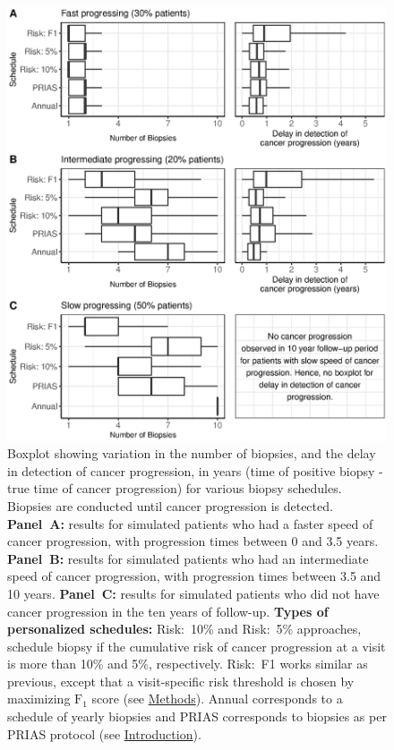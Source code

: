 \begin{figure}[!htb]
\captionsetup{justification=justified}
\centerline{\includegraphics[width=\columnwidth]{images/sim_res_combined.eps}}
\caption{Boxplot showing variation in the number of biopsies, and the delay in detection of cancer progression, in years (time of positive biopsy - true time of cancer progression) for various biopsy schedules. Biopsies are conducted until cancer progression is detected. \textbf{Panel~A:} results for simulated patients who had a faster speed of cancer progression, with progression times between 0 and 3.5 years. \textbf{Panel~B:} results for simulated patients who had an intermediate speed of cancer progression, with progression times between 3.5 and 10 years. \textbf{Panel~C:} results for simulated patients who did not have cancer progression in the ten years of follow-up. \textbf{Types of personalized schedules:} Risk:~10\% and Risk:~5\% approaches, schedule biopsy if the cumulative risk of cancer progression at a visit is more than 10\% and 5\%, respectively. Risk:~F1 works similar as previous, except that a visit-specific risk threshold is chosen by maximizing $\mbox{F}_1$ score (see \hyperref[sec:methods]{Methods}). Annual corresponds to a schedule of yearly biopsies and PRIAS corresponds to biopsies as per PRIAS protocol (see \hyperref[sec:introduction]{Introduction}).}
\label{fig:sim_res_combined}
\end{figure}

